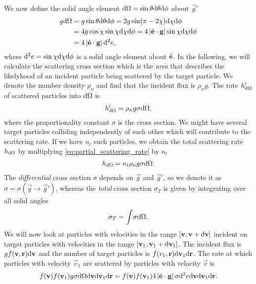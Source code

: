 We now define the solid angle element $\mathrm{d}\Omega=\sin\theta \mathrm{d}\theta \mathrm{d}\phi$ about $\vec g'$ 
\begin{align}
	g \mathrm{d}\Omega &= g\sin\theta \mathrm{d}\theta \mathrm{d}\phi = 2g\sin(\pi - 2\chi)\mathrm{d}\chi \mathrm{d}\phi\\
	&= 4g\cos\chi\sin\chi \mathrm{d}\chi \mathrm{d}\phi = 4\left|\hat {\mathbf{e}}\cdot\mathbf g\right|\sin\chi \mathrm{d}\chi \mathrm{d}\phi\\
	&= 4\left|\hat {\mathbf{e}}\cdot\mathbf g\right|\mathrm{d}^2e,
\end{align}
where $\mathrm{d}^2e = \sin\chi \mathrm{d}\chi \mathrm{d}\phi$ is a solid angle element about $\hat {\mathbf{e}}$. In the following, we will calculate the scattering cross section which is the \textit{area} that describes the likelyhood of an incident particle being scattered by the target particle. We denote the number density $\rho_n$ and find that the incident flux is $\rho_n g$. The rate $h_{\mathrm{d}\Omega}'$ of scattered particles into $\mathrm{d}\Omega$ is
\begin{align}
	\label{eq:partial_scattering_rate}
	h_{\mathrm{d}\Omega}' = \rho_n g\sigma \mathrm{d}\Omega,
\end{align}
where the proportionality constant $\sigma$ is the cross section. We might have several target particles colliding independently of each other which will contribute to the scattering rate. If we have $n_t$ such particles, we obtain the total scattering rate $h_{\mathrm{d}\Omega}$ by multiplying \eqref{eq:partial_scattering_rate} by $n_t$
\begin{align}
	h_{\mathrm{d}\Omega} = n_t\rho_n g\sigma \mathrm{d}\Omega.
\end{align}
The \textit{differential} cross section $\sigma$ depends on $\vec g$ and $\vec g'$, so we denote it as $\sigma = \sigma(\vec g\rightarrow \vec g')$, whereas the \textit{total} cross section $\sigma_T$ is given by integrating over all solid angles
\begin{align}
	\sigma_T = \int\! \sigma \mathrm{d}\Omega.
\end{align}
We will now look at particles with velocities in the range $[\mathbf v, \mathbf v + \mathrm{d}\mathbf v]$ incident on target particles with velocities in the range $[\mathbf v_1, \mathbf v_1 + \mathrm{d}\mathbf v_1]$. The incident flux is $gf(\mathbf v,\mathbf r)\mathrm{d}\mathbf v$ and the number of target particles is $f(v_1,\mathbf r)\mathrm{d}\mathbf v_1\mathrm{d}\mathbf r$. The rate at which particles with velocity $\vec v_1$ are scattered by particles with velocity $\vec v$ is 
\begin{align}
	f(\mathbf v)f(\mathbf v_1) g \sigma \mathrm{d}\Omega \mathrm{d}\mathbf v \mathrm{d}\mathbf v_1 \mathrm{d}\mathbf r = f(\mathbf v)f(\mathbf v_1)4\left|\hat {\mathbf{e}}\cdot \mathbf g\right| \sigma \mathrm{d}^2e \mathrm{d}\mathbf v \mathrm{d}\mathbf v_1 \mathrm{d}\mathbf r.
\end{align}
